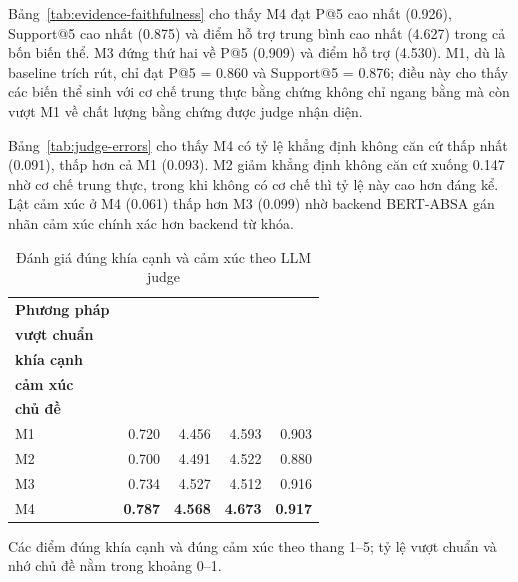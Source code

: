 \documentclass[12pt,a4paper]{report}
\begin{document}
Bảng~\ref{tab:evidence-faithfulness} cho thấy M4 đạt P@5 cao nhất (\num{0.926}), Support@5 cao nhất (\num{0.875}) và điểm hỗ trợ trung bình cao nhất (\num{4.627}) trong cả bốn biến thể. M3 đứng thứ hai về P@5 (\num{0.909}) và điểm hỗ trợ (\num{4.530}). M1, dù là baseline trích rút, chỉ đạt P@5 = \num{0.860} và Support@5 = \num{0.876}; điều này cho thấy các biến thể sinh với cơ chế trung thực bằng chứng không chỉ ngang bằng mà còn vượt M1 về chất lượng bằng chứng được judge nhận diện.

Bảng~\ref{tab:judge-errors} cho thấy M4 có tỷ lệ khẳng định không căn cứ thấp nhất (\num{0.091}), thấp hơn cả M1 (\num{0.093}). M2 giảm khẳng định không căn cứ xuống \num{0.147} nhờ cơ chế trung thực, trong khi không có cơ chế thì tỷ lệ này cao hơn đáng kể. Lật cảm xúc ở M4 (\num{0.061}) thấp hơn M3 (\num{0.099}) nhờ backend BERT-ABSA gán nhãn cảm xúc chính xác hơn backend từ khóa.

\begin{table}[tbp]
\centering
\caption{Đánh giá đúng khía cạnh và cảm xúc theo LLM judge}
\label{tab:summary-utility}
\begin{threeparttable}
\begin{tabular}{l r r r r}
\toprule
\textbf{Phương pháp} & \makecell{\textbf{Tỷ lệ}\\\textbf{vượt chuẩn}} & \makecell{\textbf{Đúng}\\\textbf{khía cạnh}} & \makecell{\textbf{Đúng}\\\textbf{cảm xúc}} & \makecell{\textbf{Nhớ}\\\textbf{chủ đề}} \\
\midrule
M1 & \num{0.720} & \num{4.456} & \num{4.593} & \num{0.903} \\
M2 & \num{0.700} & \num{4.491} & \num{4.522} & \num{0.880} \\
M3 & \num{0.734} & \num{4.527} & \num{4.512} & \num{0.916} \\
M4 & \textbf{\num{0.787}} & \textbf{\num{4.568}} & \textbf{\num{4.673}} & \textbf{\num{0.917}} \\
\bottomrule
\end{tabular}
\begin{tablenotes}
\footnotesize
\item Các điểm đúng khía cạnh và đúng cảm xúc theo thang 1--5; tỷ lệ vượt chuẩn và nhớ chủ đề nằm trong khoảng 0--1.
\end{tablenotes}
\end{threeparttable}
\end{table}
\end{document}

